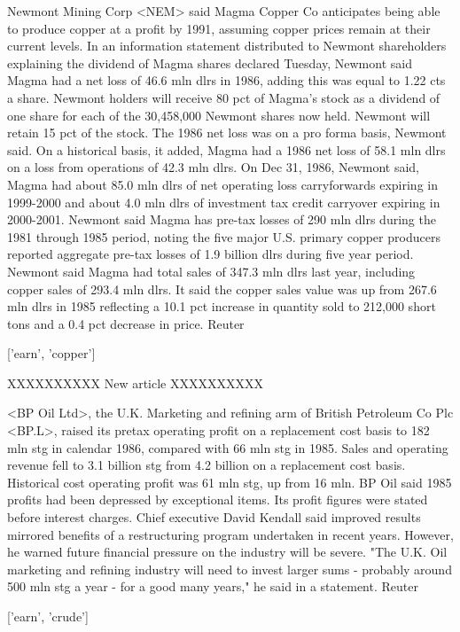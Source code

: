 \documentclass{article}
\begin{document}
\begin{pythonOutput}
Newmont Mining Corp <NEM> said Magma
Copper Co anticipates being able to produce copper at a profit
by 1991, assuming copper prices remain at their current levels.
    In an information statement distributed to Newmont
shareholders explaining the dividend of Magma shares declared
Tuesday, Newmont said Magma had a net loss of 46.6 mln dlrs in
1986, adding this was equal to 1.22 cts a share.
    Newmont holders will receive 80 pct of Magma's stock as a
dividend of one share for each of the 30,458,000 Newmont shares
now held. Newmont will retain 15 pct of the stock.
    The 1986 net loss was on a pro forma basis, Newmont said.
On a historical basis, it added, Magma had a 1986 net loss of
58.1 mln dlrs on a loss from operations of 42.3 mln dlrs.
    On Dec 31, 1986, Newmont said, Magma had about 85.0 mln
dlrs of net operating loss carryforwards expiring in 1999-2000
and about 4.0 mln dlrs of investment tax credit carryover
expiring in 2000-2001.
    Newmont said Magma has pre-tax losses of 290 mln dlrs
during the 1981 through 1985 period, noting the five major U.S.
primary copper producers reported aggregate pre-tax losses of
1.9 billion dlrs during five year period.
    Newmont said Magma had total sales of 347.3 mln dlrs last
year, including copper sales of 293.4 mln dlrs.
    It said the copper sales value was up from 267.6 mln dlrs
in 1985 reflecting a 10.1 pct increase in quantity sold to
212,000 short tons and a 0.4 pct decrease in price.
 Reuter

['earn', 'copper']

XXXXXXXXXX
New article
XXXXXXXXXX

<BP Oil Ltd>, the U.K. Marketing and
refining arm of British Petroleum Co Plc <BP.L>, raised its
pretax operating profit on a replacement cost basis to 182 mln
stg in calendar 1986, compared with 66 mln stg in 1985.
    Sales and operating revenue fell to 3.1 billion stg from
4.2 billion on a replacement cost basis. Historical cost
operating profit was 61 mln stg, up from 16 mln.
    BP Oil said 1985 profits had been depressed by exceptional
items. Its profit figures were stated before interest charges.
    Chief executive David Kendall said improved results
mirrored benefits of a restructuring program undertaken in
recent years.
    However, he warned future financial pressure on the
industry will be severe.
    "The U.K. Oil marketing and refining industry will need to
invest larger sums - probably around 500 mln stg a year - for a
good many years," he said in a statement.
 Reuter

['earn', 'crude']


\end{pythonOutput}
\end{document}
